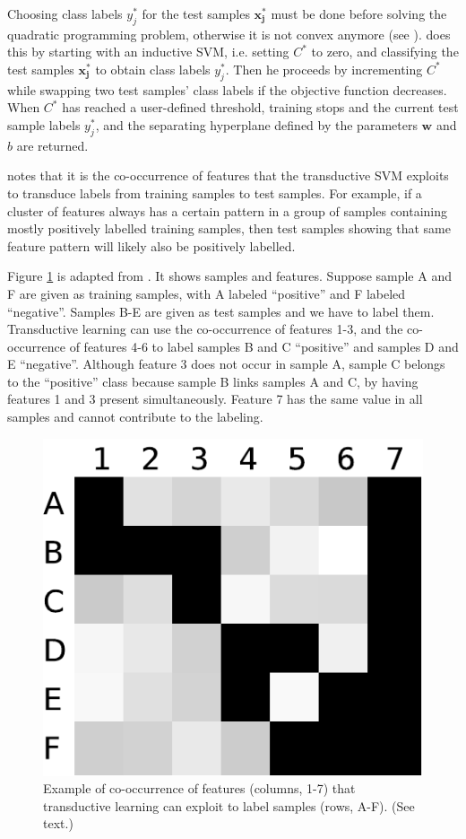 Choosing class labels $y_{j}^{*}$ for the test samples $\mathbf{x_{j}^{*}}$
must be done before solving the quadratic programming problem, otherwise
it is not convex anymore (see \cite{CollobertBottou2006}). \cite{Joachims1999a}
does this by starting with an inductive SVM, i.e. setting $C^{*}$
to zero, and classifying the test samples $\mathbf{x_{j}^{*}}$ to
obtain class labels $y_{j}^{*}$. Then he proceeds by incrementing
$C^{*}$ while swapping two test samples' class labels if the objective
function decreases. When $C^{*}$ has reached a user-defined threshold,
training stops and the current test sample labels $y_{j}^{*}$, and
the separating hyperplane defined by the parameters $\mathbf{w}$
and $b$\textbf{ }are returned.

\cite{Joachims1999a} notes that it is the co-occurrence of features
that the transductive SVM exploits to transduce labels from training
samples to test samples. For example, if a cluster of features always
has a certain pattern in a group of samples containing mostly positively
labelled training samples, then test samples showing that same feature
pattern will likely also be positively labelled.

Figure \ref{fig:transductive-feature-co-occurrence} is adapted from
\cite{Joachims1999a}. It shows samples and features. Suppose sample
A and F are given as training samples, with A labeled ``positive''
and F labeled ``negative''. Samples B-E are given as test samples
and we have to label them. Transductive learning can use the co-occurrence
of features 1-3, and the co-occurrence of features 4-6 to label samples
B and C ``positive'' and samples D and E ``negative''. Although
feature 3 does not occur in sample A, sample C belongs to the ``positive''
class because sample B links samples A and C, by having features 1
and 3 present simultaneously. Feature 7 has the same value in all
samples and cannot contribute to the labeling.

\begin{figure}
\begin{centering}
\includegraphics[width=0.35\columnwidth]{images/TSVM-co-occurrence-pattern}
\par\end{centering}
\caption[Example of the co-occurrence of features that transductive learning
can exploit.]{\label{fig:transductive-feature-co-occurrence}Example of co-occurrence
of features (columns, 1-7) that transductive learning can exploit
to label samples (rows, A-F). (See text.)}
\end{figure}

